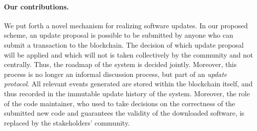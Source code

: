 \paragraph{Our contributions.}
We put forth a novel mechanism for realizing software updates. In our proposed scheme, an update proposal is possible to be submitted by anyone who can submit a transaction to the blockchain. The decision of which update proposal will be applied and which will not is taken collectively by the community and not centrally. Thus, the roadmap of the system is decided jointly. Moreover, this process is no longer an informal discussion process, but part of an \emph{update protocol}. All relevant events generated are stored within the blockchain itself, and thus recorded in the immutable update history of the system. Moreover, the role of the code maintainer, who used to take decisions on the correctness of the submitted new code and guarantees the validity of the downloaded software, is replaced by the stakeholders' community.


